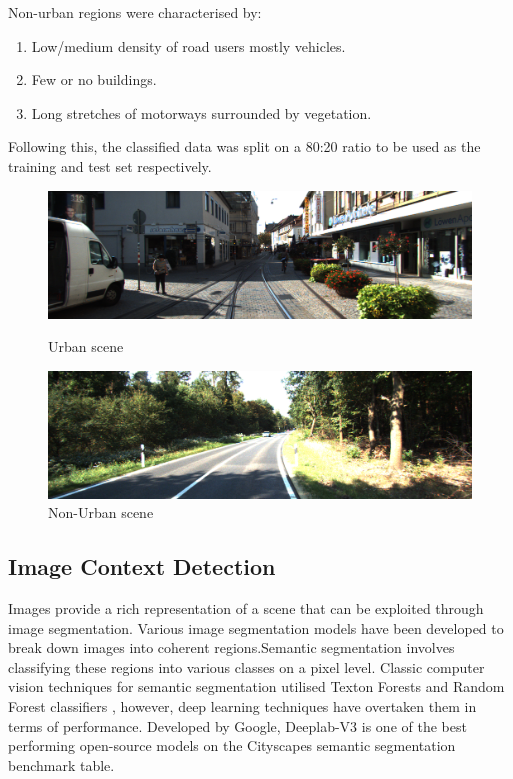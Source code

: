 \noindent
Non-urban regions were characterised by: 
\begin{enumerate}
	\item Low/medium density of road users mostly vehicles.
	\item Few or no buildings. 
	\item Long stretches of motorways surrounded by vegetation. 
\end{enumerate}

Following this, the classified data was split on a 80:20 ratio to be used as the training and test set respectively. 

\begin{figure}[h]
	\centering
	\begin{minipage}[b]{0.4\textwidth}
		\includegraphics[width=\textwidth]{images/urban.png}
		\caption{Urban scene}
	\end{minipage}
	\hfill
	\begin{minipage}[b]{0.4\textwidth}
		\includegraphics[width=\textwidth]{images/non_urban.png}
		\caption{Non-Urban scene}
	\end{minipage}
\end{figure}


\subsection{Image Context Detection}

Images provide a rich representation of a scene that can be exploited through image segmentation. Various image segmentation models have been developed to break down images into coherent regions.Semantic segmentation involves classifying these regions into various classes on a pixel level. 
Classic computer vision techniques for semantic segmentation utilised Texton Forests\cite{shotton2008semantic} and Random Forest classifiers \cite{shotton2011real}, however, deep learning techniques have overtaken them in terms of performance. 
Developed by Google,  Deeplab-V3 is one of the best performing open-source models on the Cityscapes semantic segmentation benchmark table. 

